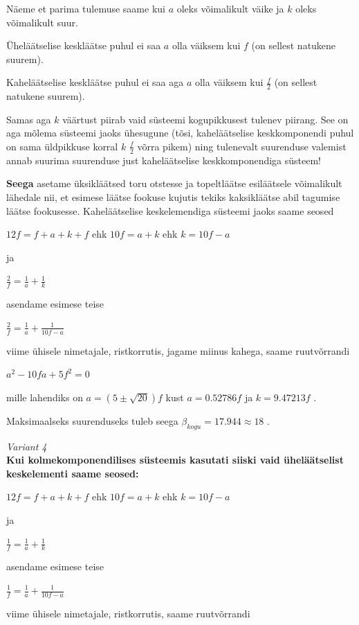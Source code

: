 \documentclass[10pt]{article}
\begin{document}
Näeme et parima tulemuse saame kui $a$ oleks võimalikult väike ja $k$ oleks võimalikult suur.

Üheläätselise keskläätse puhul ei saa  $a$ olla väiksem kui $f$ (on sellest natukene suurem).

Kaheläätselise keskläätse puhul ei saa aga $a$ olla väiksem kui $ \frac {f}{2}$ (on sellest natukene suurem).

Samas aga $k$ väärtust piirab vaid süsteemi kogupikkusest tulenev piirang. See on aga mõlema süsteemi jaoks ühesugune (tõsi, kaheläätselise keskkomponendi puhul on sama üldpikkuse korral $k$ $ \frac{f}{2}$ võrra pikem) ning tulenevalt suurenduse valemist annab  suurima suurenduse just kaheläätselise keskkomponendiga süsteem!

\textbf{Seega} asetame üksikläätsed toru otstesse ja topeltläätse esiläätsele võimalikult lähedale nii, et esimese läätse fookuse kujutis tekiks kaksikläätse abil tagumise läätse fookusesse.
Kaheläätselise keskelemendiga süsteemi jaoks saame seosed

$ 12f = f + a + k + f $ ehk $ 10f = a + k $ ehk $ k = 10f - a $

ja

$ \frac{2}{f} = \frac{1}{a} + \frac{1}{k} $

asendame esimese teise

$ \frac {2}{f} = \frac {1}{a} + \frac {1}{10f - a} $

viime ühisele nimetajale, ristkorrutis, jagame miinus kahega, saame ruutvõrrandi

$ a^2 - 10fa + 5f^2 =0 $

mille lahendiks on $ a = (5 \pm \sqrt{20}) f $ kust $a=0.52786f $ ja $k=9.47213f$ .

Maksimaalseks suurenduseks tuleb seega $ {\beta}_{kogu} = 17.944 \approx 18 $ .


\emph{Variant 4}\\
\textbf {Kui kolmekomponendilises süsteemis kasutati siiski vaid üheläätselist keskelementi saame seosed:}

$ 12f = f + a + k + f $ ehk $ 10f = a + k $ ehk $ k = 10f - a $

ja

$ \frac {1}{f} = \frac{1}{a} + \frac{1}{k} $

asendame esimese teise

$ \frac {1}{f} = \frac {1}{a} + \frac {1}{10f - a} $

viime ühisele nimetajale, ristkorrutis, saame ruutvõrrandi
\end{document}
